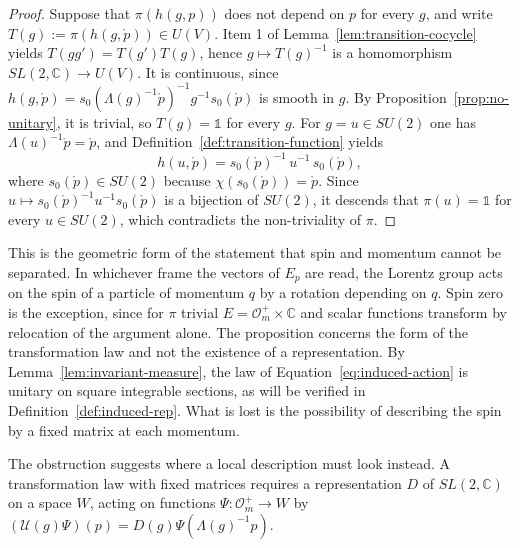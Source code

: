 \begin{proof}
	Suppose that $\pi(h(g,p))$ does not depend on $p$ for every $g$, and write $T(g):=\pi(h(g,\mathring{p}))\in U(V)$. Item 1 of Lemma~\ref{lem:transition-cocycle} yields $T(gg')=T(g')T(g)$, hence $g\mapsto T(g)^{-1}$ is a homomorphism $SL(2,\mathbb{C})\to U(V)$. It is continuous, since $h(g,\mathring{p})=s_0(\Lambda(g)^{-1}\mathring{p})^{-1}g^{-1}s_0(\mathring{p})$ is smooth in $g$. By Proposition~\ref{prop:no-unitary}, it is trivial, so $T(g)=\mathbb{1}$ for every $g$. For $g=u\in SU(2)$ one has $\Lambda(u)^{-1}\mathring{p}=\mathring{p}$, and Definition~\ref{def:transition-function} yields
	\begin{equation*}
		h(u,\mathring{p})=s_0(\mathring{p})^{-1}\,u^{-1}\,s_0(\mathring{p}),
	\end{equation*}
	where $s_0(\mathring{p})\in SU(2)$ because $\chi(s_0(\mathring{p}))=\mathring{p}$. Since $u\mapsto s_0(\mathring{p})^{-1}u^{-1}s_0(\mathring{p})$ is a bijection of $SU(2)$, it descends that $\pi(u)=\mathbb{1}$ for every $u\in SU(2)$, which contradicts the non-triviality of $\pi$.
\end{proof}

\begin{remark}
	This is the geometric form of the statement that spin and momentum cannot be separated. In whichever frame the vectors of $E_p$ are read, the Lorentz group acts on the spin of a particle of momentum $q$ by a rotation depending on $q$. Spin zero is the exception, since for $\pi$ trivial $E=\mathcal{O}_m^+\times\mathbb{C}$ and scalar functions transform by relocation of the argument alone. The proposition concerns the form of the transformation law and not the existence of a representation. By Lemma~\ref{lem:invariant-measure}, the law of Equation~\eqref{eq:induced-action} is unitary on square integrable sections, as will be verified in Definition~\ref{def:induced-rep}. What is lost is the possibility of describing the spin by a fixed matrix at each momentum.
\end{remark}

The obstruction suggests where a local description must look instead. A transformation law with fixed matrices requires a representation $D$ of $SL(2,\mathbb{C})$ on a space $W$, acting on functions $\Psi:\mathcal{O}_m^+\to W$ by $(\mathcal{U}(g)\Psi)(p)=D(g)\Psi(\Lambda(g)^{-1}p)$.

